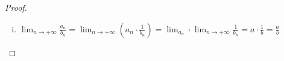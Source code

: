 \documentclass[main.tex]{subfiles}
\begin{document}
\begin{proof}
\begin{enumerate}[i)]
\begin{proof}
\begin{description}
                        $ \lim_{n \to +\infty} b_{n} =b \Rightarrow 
                        \exists n_{0} \in \mathbb{N} \; : \; 
                        \forall n \geq n_{0} \quad \abs{b_{n}-b} < 
                        \frac{\abs{b}}{2} = \varepsilon $

                        Οπότε $ \forall n \geq n_{0} \; : \; 
                        \abs{\abs{b_{n}} - \abs{b}} \leq \abs{b_{n}-b}
                        < \frac{\abs{b}}{2} \Rightarrow \abs{b_{n}} 
                        \overset{\eqref{eq:lemidiot}}{<} 
                        \frac{\abs{b}}{2}   $ 
                \end{description}

                Τώρα αν $ n \geq n_{1} $ ισχύει ότι:

                $ \abs{\frac{1}{b_{n}} - \frac{1}{b}} = 
                \frac{b-b_{n}}{b_{n}\cdot b} = \frac{\abs{b-b_{n}}
                    }{\abs{b_{n}} \cdot \abs{b}} < \frac{2 
                \abs{b - b_{n}}}{\abs{b}^{2}} $

                Έστω $ \varepsilon >0 $, τότε
                \[
                    \lim_{n \to +\infty} b_{n} =b \Leftrightarrow 
                    \exists n_{2} \in \mathbb{N} \; : \; \forall n 
                    \geq n_{2} \quad \abs{b - b_{n}} < 
                    \frac{\varepsilon \abs{b}^{2}}{2}
                \] 

                Επιλέγουμε $ n_{0} = \max \{ n_{1}, n_{2} \} $. 
                Τότε $ \forall n \geq n_{0} $ ισχύει ότι 
                \[
                    \abs{\frac{1}{b_{n}} - \frac{1}{b}} \leq 
                    \frac{2 \abs{b -b_{n}}}{\abs{b} ^{2}} < \varepsilon 
                \] 
            \end{proof}

        \item $ \lim_{n \to +\infty} \frac{a_{n}}{b_{n}} = 
            \lim_{n \to +\infty} \left(a_{n}\cdot \frac{1}{b_{n}}
            \right) = \lim_{a_{n}} \cdot \lim_{n \to +\infty} 
            \frac{1}{b_{n}} = a \cdot \frac{1}{b} = \frac{a}{b}$


\end{enumerate}
\end{proof}
\end{document}
